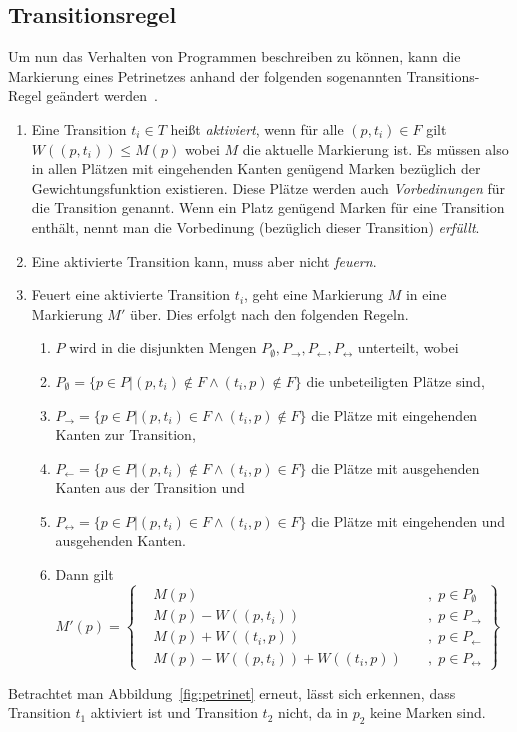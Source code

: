 \subsection{Transitionsregel} Um nun das Verhalten von Programmen beschreiben zu können, kann die Markierung eines Petrinetzes anhand der folgenden sogenannten Transitions-Regel geändert werden~\cite{Murata1989}.
\begin{enumerate}
	\item Eine Transition $t_i \in T$ heißt \emph{aktiviert}, wenn für alle $(p,t_i) \in F $ gilt $ W((p,t_i)) \leq M(p)$ wobei $M$ die aktuelle Markierung ist. Es müssen also in allen Plätzen mit eingehenden Kanten genügend Marken bezüglich der Gewichtungsfunktion existieren. Diese Plätze werden auch \emph{Vorbedinungen} für die Transition genannt. Wenn ein Platz genügend Marken für eine Transition enthält, nennt man die Vorbedinung (bezüglich dieser Transition) \emph{erfüllt}.
	\item Eine aktivierte Transition kann, muss aber nicht \emph{feuern}.
	\item Feuert eine aktivierte Transition $t_i$, geht eine Markierung $M$ in eine Markierung $M'$ über. Dies erfolgt nach den folgenden Regeln.
	\begin{enumerate}
		\item $P$ wird in die disjunkten Mengen $P_\emptyset, P_\rightarrow, P_\leftarrow, P_\leftrightarrow$ unterteilt, wobei 
		\item $P_\emptyset = \{p \in P | (p,t_i) \notin F \land (t_i,p) \notin F\}$ die unbeteiligten Plätze sind,
		\item $P_\rightarrow = \{p \in P | (p,t_i) \in F \land (t_i,p) \notin F\}$ die Plätze mit eingehenden Kanten zur Transition,
		\item $P_\leftarrow = \{p \in P | (p,t_i) \notin F \land (t_i,p) \in F\}$ die Plätze mit ausgehenden Kanten aus der Transition und 
		\item $P_\leftrightarrow = \{p \in P | (p,t_i) \in F \land (t_i,p) \in F\}$ die Plätze mit eingehenden und ausgehenden Kanten.
		\item Dann gilt $
			M'(p) = \left\{ 
				\begin{aligned}
					& M(p) && \; , \; p \in P_\emptyset\\
					& M(p)-W((p,t_i)) && \; , \; p \in P_\rightarrow\\
					&M(p)+W((t_i,p)) && \; , \; p \in P_\leftarrow\\
					& M(p)-W((p,t_i))+W((t_i,p)) && \; , \; p \in P_\leftrightarrow
				\end{aligned}
				\right\}
		$
	\end{enumerate}
\end{enumerate}
Betrachtet man Abbildung~\ref{fig:petrinet} erneut, lässt sich erkennen, dass Transition $t_1$ aktiviert ist und Transition $t_2$ nicht, da in $p_2$ keine Marken sind.

